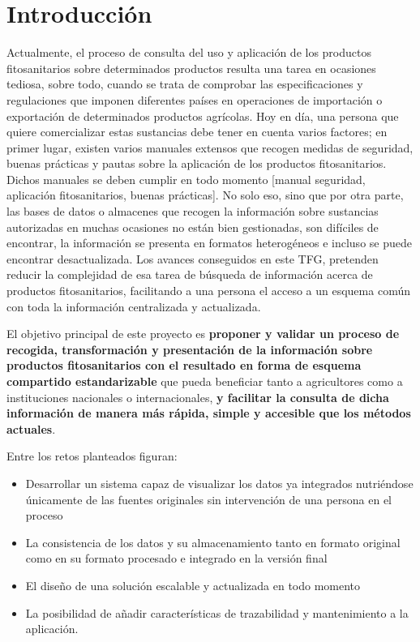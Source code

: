 \chapter{Introducción} \label{introduccion}
Actualmente, el proceso de consulta del uso y aplicación de los productos fitosanitarios sobre determinados productos resulta una tarea en ocasiones tediosa, sobre todo, cuando se trata de comprobar las especificaciones y regulaciones que imponen diferentes países en operaciones de importación o exportación de determinados productos agrícolas. Hoy en día, una persona que quiere comercializar estas sustancias debe tener en cuenta varios factores; en primer lugar, existen varios manuales extensos que recogen medidas de seguridad, buenas prácticas y pautas sobre la aplicación de los productos fitosanitarios. Dichos manuales se deben cumplir en todo momento [manual seguridad, aplicación fitosanitarios, buenas prácticas]. No solo eso, sino que por otra parte, las bases de datos o almacenes que recogen la información sobre sustancias autorizadas en muchas ocasiones no están bien gestionadas, son difíciles de encontrar, la información se presenta en formatos heterogéneos e incluso se puede encontrar desactualizada. Los avances conseguidos en este TFG, pretenden reducir la complejidad de esa tarea de búsqueda de información acerca de productos fitosanitarios, facilitando a una persona el acceso a un esquema común con toda la información centralizada y actualizada.\par

El objetivo principal de este proyecto es \textbf{proponer y validar un proceso de recogida, transformación y presentación de la información sobre productos fitosanitarios con el resultado en forma de esquema compartido estandarizable} que pueda beneficiar tanto a agricultores como a instituciones nacionales o internacionales, \textbf{y facilitar la consulta de dicha información de manera más rápida, simple y accesible que los métodos actuales}. \par
Entre los retos planteados figuran:
\begin{itemize}
\item Desarrollar un sistema capaz de visualizar los datos ya integrados nutriéndose únicamente de las fuentes originales sin intervención de una persona en el proceso
\item La consistencia de los datos y su almacenamiento tanto en formato original como en su formato procesado e integrado en la versión final
\item El diseño de una solución escalable y actualizada en todo momento
\item La posibilidad de añadir características de trazabilidad y mantenimiento a la aplicación.
\end{itemize}

